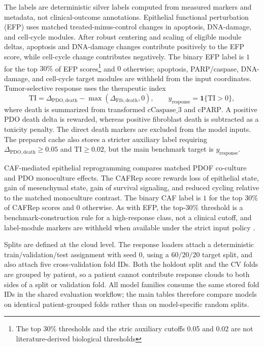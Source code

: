 \documentclass{article}
\theoremstyle{remark}
\theoremstyle{plain}
\begin{document}
The labels are deterministic silver labels computed from measured markers and metadata, not clinical-outcome annotations. Epithelial functional perturbation (EFP) uses matched treated-minus-control changes in apoptosis, DNA-damage, and cell-cycle modules\citep{nicholson1995apopain, tewari1995yama,
    jackson2009dnadamage, lord2012dnatherapy, malumbres2009cellcycle, hanahan2022hallmarks}. After robust centering and scaling of eligible module deltas, apoptosis and DNA-damage changes contribute positively to the EFP score, while cell-cycle change contributes negatively. The binary EFP label is \(1\) for the top \(30\%\) of EFP scores\footnote{The top 30\% thresholds and the stric auxiliary cutoffs 0.05 and 0.02 are not literature-derived biological thresholds} and \(0\) otherwise; apoptosis, PARP/caspase, DNA-damage, and cell-cycle target modules are withheld from the input coordinates. 
Tumor-selective response uses the therapeutic index
\[
\mathrm{TI}=\Delta_{\mathrm{PDO,death}}-\max(\Delta_{\mathrm{Fib,death}},0),
\qquad
y_{\mathrm{response}}=\mathbf{1}\{\mathrm{TI}>0\},
\]
where death is summarized from transformed \(\mathrm{cCaspase\_3}\)\citep{nicholson1995apopain} and \(\mathrm{cPARP}\)\citep{tewari1995yama}. A positive PDO death delta is rewarded, whereas positive fibroblast death is subtracted as a toxicity penalty\citep{ RamosZapatero2023, kalluri2016fibroblasts, sahai2020caf}. The direct death markers are excluded from the model inputs. The prepared cache also stores a stricter auxiliary label requiring \(\Delta_{\mathrm{PDO,death}}\geq0.05\) and \(\mathrm{TI}\geq0.02\), but the main benchmark target is \(y_{\mathrm{response}}\).

CAF-mediated epithelial reprogramming compares matched PDOF co-culture and PDO monoculture effects. The CAFRep score \citep{thiery2009emt, manning2007akt,
    malumbres2009cellcycle} rewards loss of epithelial state, gain of mesenchymal state, gain of survival signaling, and reduced cycling relative to the matched monoculture contrast. The binary CAF label is \(1\) for the top \(30\%\) of CAFRep scores and \(0\) otherwise. As with EFP, the top-\(30\%\) threshold is a benchmark-construction rule for a high-response class, not a clinical cutoff, and label-module markers are withheld when available under the strict input policy \cite{RamosZapatero2023, kalluri2016fibroblasts, sahai2020caf}.

Splits are defined at the cloud level. The response loaders attach a deterministic train/validation/test assignment with seed \(0\), using a \(60/20/20\) target split, and also attach five cross-validation fold IDs. Both the holdout split and the CV folds are grouped by patient, so a patient cannot contribute response clouds to both sides of a split or validation fold. All model families consume the same stored fold IDs in the shared evaluation workflow; the main tables therefore compare models on identical patient-grouped folds rather than on model-specific random splits.
\end{document}
